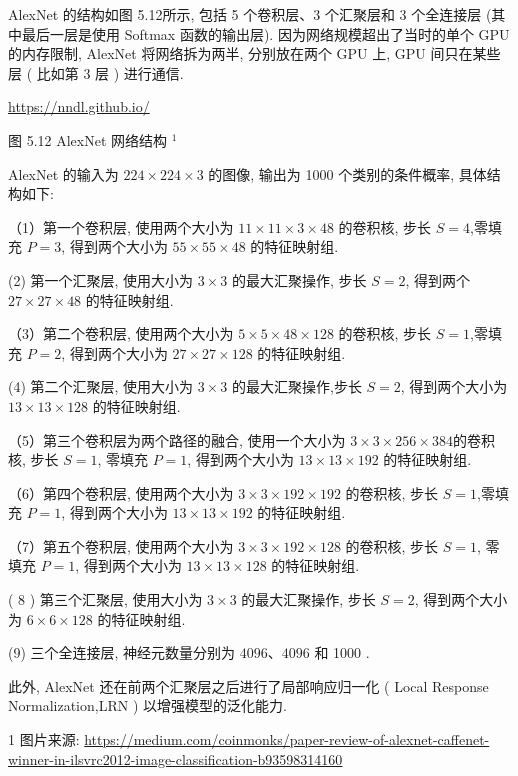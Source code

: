 \documentclass[10pt]{article}
\begin{document}
AlexNet 的结构如图 5.12所示, 包括 5 个卷积层、3 个汇聚层和 3 个全连接层 (其中最后一层是使用 Softmax 函数的输出层). 因为网络规模超出了当时的单个 GPU 的内存限制, AlexNet 将网络拆为两半, 分别放在两个 GPU 上, GPU 间只在某些层 ( 比如第 3 层 ) 进行通信.

\href{https://nndl.github.io/}{https://nndl.github.io/}



图 5.12 AlexNet 网络结构 ${ }^{1}$

AlexNet 的输入为 $224 \times 224 \times 3$ 的图像, 输出为 1000 个类别的条件概率, 具体结构如下:

（1）第一个卷积层, 使用两个大小为 $11 \times 11 \times 3 \times 48$ 的卷积核, 步长 $S=4$,零填充 $P=3$, 得到两个大小为 $55 \times 55 \times 48$ 的特征映射组.

(2) 第一个汇聚层, 使用大小为 $3 \times 3$ 的最大汇聚操作, 步长 $S=2$, 得到两个 $27 \times 27 \times 48$ 的特征映射组.

（3）第二个卷积层, 使用两个大小为 $5 \times 5 \times 48 \times 128$ 的卷积核, 步长 $S=1$,零填充 $P=2$, 得到两个大小为 $27 \times 27 \times 128$ 的特征映射组.

(4) 第二个汇聚层, 使用大小为 $3 \times 3$ 的最大汇聚操作,步长 $S=2$, 得到两个大小为 $13 \times 13 \times 128$ 的特征映射组.

（5）第三个卷积层为两个路径的融合, 使用一个大小为 $3 \times 3 \times 256 \times 384$的卷积核, 步长 $S=1$, 零填充 $P=1$, 得到两个大小为 $13 \times 13 \times 192$ 的特征映射组.

（6）第四个卷积层, 使用两个大小为 $3 \times 3 \times 192 \times 192$ 的卷积核, 步长 $S=1$,零填充 $P=1$, 得到两个大小为 $13 \times 13 \times 192$ 的特征映射组.

（7）第五个卷积层, 使用两个大小为 $3 \times 3 \times 192 \times 128$ 的卷积核, 步长 $S=1$, 零填充 $P=1$, 得到两个大小为 $13 \times 13 \times 128$ 的特征映射组.

( 8 ) 第三个汇聚层, 使用大小为 $3 \times 3$ 的最大汇聚操作, 步长 $S=2$, 得到两个大小为 $6 \times 6 \times 128$ 的特征映射组.

(9) 三个全连接层, 神经元数量分别为 $4096 、 4096$ 和 1000 .

此外, AlexNet 还在前两个汇聚层之后进行了局部响应归一化 ( Local Response Normalization,LRN ) 以增强模型的泛化能力.

1 图片来源: \href{https://medium.com/coinmonks/paper-review-of-alexnet-caffenet-winner-in-ilsvrc2012-image-classification-b93598314160}{https://medium.com/coinmonks/paper-review-of-alexnet-caffenet-winner-in-ilsvrc2012-image-classification-b93598314160}
\end{document}
